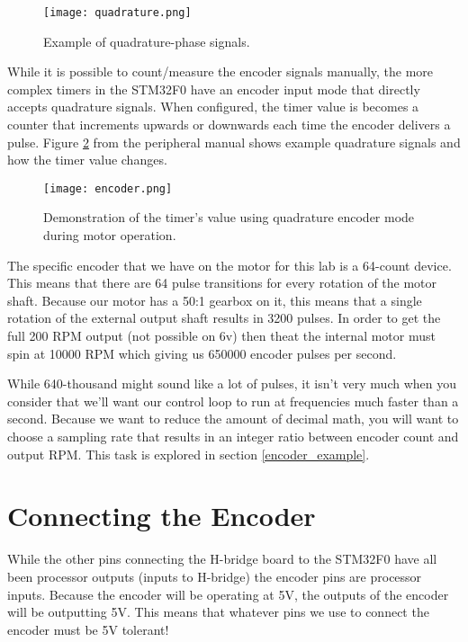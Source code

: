 \documentclass[11pt,fleqn]{book} %
\begin{document}
\begin{figure}[tb]
    \centering\texttt{[image: quadrature.png]}
    \caption{Example of quadrature-phase signals.}
    \label{quadrature}
\end{figure}

\noindent While it is possible to count/measure the encoder signals manually, the more complex timers in the STM32F0 have an encoder input mode that directly accepts quadrature signals. When configured, the timer value is becomes a counter that increments upwards or downwards each time the encoder delivers a pulse. Figure \ref{encoder} from the peripheral manual shows example quadrature signals and how the timer value changes.

\begin{figure}[tb]
    \centering\texttt{[image: encoder.png]}
    \caption{Demonstration of the timer's value using quadrature encoder mode during motor operation. }
    \label{encoder}
\end{figure}

The specific encoder that we have on the motor for this lab is a 64-count device. This means that there are 64 pulse transitions for every rotation of the motor shaft. Because our motor has a 50:1 gearbox on it, this means that a single rotation of the external output shaft results in 3200 pulses. In order to get the full 200 RPM output (not possible on 6v) then theat the internal motor must spin at 10000 RPM which giving us 650000 encoder pulses per second. 

While 640-thousand might sound like a lot of pulses, it isn't very much when you consider that we'll want our control loop to run at frequencies much faster than a second. Because we want to reduce the amount of decimal math, you will want to choose a sampling rate that results in an integer ratio between encoder count and output RPM. This task is explored in section \ref{encoder_example}.

\section{Connecting the Encoder}
While the other pins connecting the H-bridge board to the STM32F0 have all been processor outputs (inputs to H-bridge) the encoder pins are processor inputs. Because the encoder will be operating at 5V, the outputs of the encoder will be outputting 5V. This means that whatever pins we use to connect the encoder must be 5V tolerant!
\end{document}
